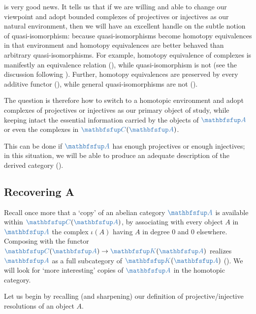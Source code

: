  is very good news. It tells us that if we
are willing and able to change our viewpoint and adopt bounded
complexes of projectives or injectives as our natural environment,
then we will have an excellent handle on the subtle notion of
quasi-isomorphism: because quasi-isomorphisms become homotopy
equivalences in that environment and homotopy equivalences are better
behaved than arbitrary quasi-isomorphisms. For example, homotopy
equivalence of complexes is manifestly an equivalence relation
(),
while quasi-isomorphism is not (see the discussion following
). Further, homotopy equivalences are preserved by
every additive functor (), while general
quasi-isomorphisms are not
().

The question is therefore how to switch to a homotopic environment and
adopt complexes of projectives or injectives as our primary object of
study, while keeping intact the essential information carried by the
objects of $\categ{A}$ or even the complexes in
$\categ{C}(\categ{A})$.

This can be done if $\categ{A}$ has enough projectives or enough
injectives; in this situation, we will be able to produce an adequate
description of the derived category
().

\subsection{Recovering A}
\label{subsec:homol:recovering-a}

Recall once more that a `copy' of an abelian category $\categ{A}$ is
available within $\categ{C}(\categ{A})$, by associating with every
object $A$ in $\categ{A}$ the complex $\iota(A)$ having $A$ in degree
$0$ and $0$ elsewhere. Composing with the functor
$\categ{C}(\categ{A}) \to \categ{K}(\categ{A})$ realizes $\categ{A}$
as a full subcategory of $\categ{K}(\categ{A})$
(). We will look for
`more interesting' copies of $\categ{A}$ in the homotopic category.

Let us begin by recalling (and sharpening) our definition of
projective/injective resolutions of an object $A$.

